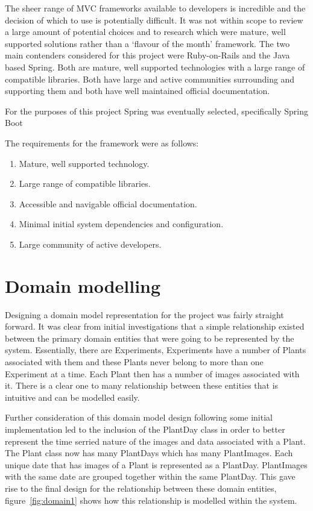 The sheer range of MVC frameworks available to developers is incredible and the decision of which to use is potentially difficult. It was not within scope to review a large amount of potential choices and to research which were mature, well supported solutions rather than a `flavour of the month' framework. The two main contenders considered for this project were Ruby-on-Rails and the Java based Spring. Both are mature, well supported technologies with a large range of compatible libraries. Both have large and active communities surrounding and supporting them and both have well maintained official documentation. 

For the purposes of this project Spring was eventually selected, specifically Spring Boot\cite{_boot}

The requirements for the framework were as follows:
\begin{enumerate}
\item Mature, well supported technology.
\item Large range of compatible libraries.
\item Accessible and navigable official documentation.
\item Minimal initial system dependencies and configuration.
\item Large community of active developers.
\end{enumerate}



\section{Domain modelling}

Designing a domain model representation for the project was fairly straight forward. It was clear from initial investigations that a simple relationship existed between the primary domain entities that were going to be represented by the system. Essentially, there are Experiments, Experiments have a number of Plants associated with them and these Plants never belong to more than one Experiment at a time. Each Plant then has a number of images associated with it. There is a clear one to many relationship between these entities that is intuitive and can be modelled easily.

Further consideration of this domain model design following some initial implementation led to the inclusion of the PlantDay class in order to better represent the time serried nature of the images and data associated with a Plant. The Plant class now has many PlantDays which has many PlantImages. Each unique date that has images of a Plant is represented as a PlantDay. PlantImages with the same date are grouped together within the same PlantDay. This gave rise to the final design for the relationship between these domain entities, figure~\ref{fig:domain1} shows how this relationship is modelled within the system. 


